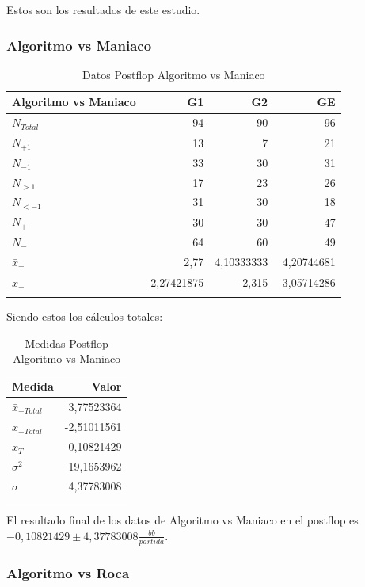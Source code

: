 Estos son los resultados de este estudio.

\subsubsection{Algoritmo vs Maniaco}

\begin{longtable}[c]{lrrr}
\hline 
Algoritmo vs Maniaco & G1 & G2 & GE \\ \hline
$N_{Total}$ & 94 & 90 & 96 \\
$N_{+1}$& 13 & 7 & 21 \\
$N_{-1}$ & 33 & 30 & 31 \\
$N_{>1}$& 17 & 23 & 26 \\
$N_{<-1}$& 31 & 30 & 18 \\  
$N_{+}$ & 30 & 30 & 47 \\
$N_{-}$& 64 & 60 & 49 \\\hline
$\bar{x}_+$ & 2,77 & 4,10333333 & 4,20744681 \\
$\bar{x}_-$& -2,27421875 & -2,315 & -3,05714286 \\ \hline
\caption{Datos Postflop Algoritmo vs Maniaco}
\label{tab:DPFAvM}
\end{longtable}

Siendo estos los cálculos totales:

\vspace{5mm} %

\begin{longtable}[c]{lr}
\hline 
Medida & Valor \\ \hline 
$\bar{x}_{+Total}$ & 3,77523364 \\
$\bar{x}_{-Total}$ & -2,51011561 \\
$\bar{x}_T$ & -0,10821429 \\
$\sigma^2$ & 19,1653962 \\
$\sigma$ & 4,37783008 \\  \hline
\caption{Medidas Postflop Algoritmo vs Maniaco}
\label{tab:MPFAvM}
\end{longtable}

El resultado final de los datos de Algoritmo vs Maniaco en el postflop es  $-0,10821429\pm4,37783008 $$\frac{bb}{partida}$.

\vspace{5mm} %

\subsubsection{Algoritmo vs Roca}

